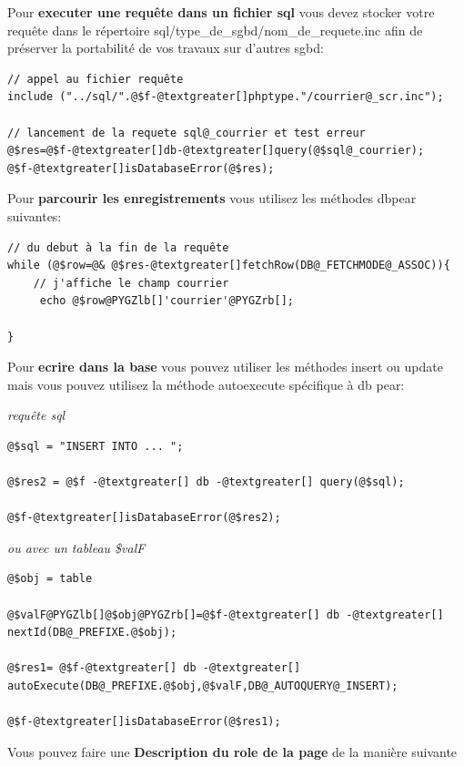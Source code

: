 \documentclass[letterpaper,10pt,french]{manual}
\begin{document}
Pour \textbf{executer une requête dans un fichier sql} vous devez stocker
votre requête dans le répertoire sql/type\_de\_sgbd/nom\_de\_requete.inc
afin de préserver la portabilité de vos travaux sur d'autres sgbd:

\begin{Verbatim}[commandchars=@\[\]]
// appel au fichier requête
include ("../sql/".@$f-@textgreater[]phptype."/courrier@_scr.inc");

// lancement de la requete sql@_courrier et test erreur
@$res=@$f-@textgreater[]db-@textgreater[]query(@$sql@_courrier);
@$f-@textgreater[]isDatabaseError(@$res);
\end{Verbatim}

Pour \textbf{parcourir les enregistrements} vous utilisez les méthodes dbpear suivantes:

\begin{Verbatim}[commandchars=@\[\]]
// du debut à la fin de la requête
while (@$row=@& @$res-@textgreater[]fetchRow(DB@_FETCHMODE@_ASSOC)){
    // j'affiche le champ courrier
     echo @$row@PYGZlb[]'courrier'@PYGZrb[];

}
\end{Verbatim}

Pour \textbf{ecrire dans la base} vous pouvez utiliser les méthodes insert ou update
mais vous pouvez utilisez la méthode autoexecute spécifique à db pear:

\emph{requête sql}

\begin{Verbatim}[commandchars=@\[\]]
@$sql = "INSERT INTO ... ";

@$res2 = @$f -@textgreater[] db -@textgreater[] query(@$sql);

@$f-@textgreater[]isDatabaseError(@$res2);
\end{Verbatim}

\emph{ou avec un tableau \$valF}

\begin{Verbatim}[commandchars=@\[\]]
@$obj = table

@$valF@PYGZlb[]@$obj@PYGZrb[]=@$f-@textgreater[] db -@textgreater[] nextId(DB@_PREFIXE.@$obj);

@$res1= @$f-@textgreater[] db -@textgreater[] autoExecute(DB@_PREFIXE.@$obj,@$valF,DB@_AUTOQUERY@_INSERT);

@$f-@textgreater[]isDatabaseError(@$res1);
\end{Verbatim}

Vous pouvez faire une \textbf{Description du role de la page} de la manière suivante
\end{document}

